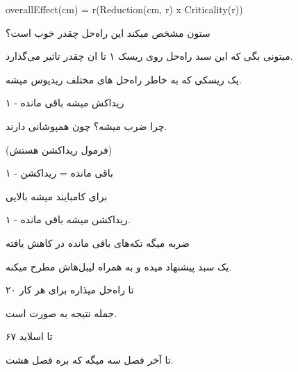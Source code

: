 overallEffect(cm) = \sigma r(Reduction(cm, r) x Criticality(r))

ستون  مشخص میکند این راه‌حل چقدر خوب است؟

میتونی بگی که این سبد راه‌حل روی ریسک ۱ تا ان چقدر تاثیر می‌گذارد.

یک ریسکی که به خاطر راه‌حل ‌های مختلف ریدیوس میشه. 

۱ - ریداکش میشه باقی مانده

چرا ضرب میشه؟ چون همپوشانی دارند.

(فرمول ریداکشن هستش)

۱ - باقی مانده = ریداکشن

برای کامبایند میشه بالایی

۱ - ریداکشن میشه باقی مانده. 

ضربه میگه تکه‌های باقی مانده در کاهش یافته

یک سبد پیشنهاد میده و به همراه لیبل‌هاش مطرح میکنه.

۲۰ تا راه‌حل میذاره برای هر کار

جمله نتیجه به صورت  است.

تا اسلاید ۶۷

تا آخر فصل سه میگه که بره فصل هشت.